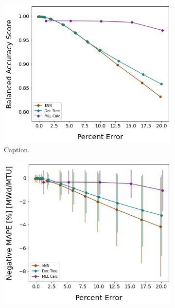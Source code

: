 \begin{figure}[!ht]
    \centering
    \begin{subfigure}[b]{0.49\textwidth}
        \centering
        \includegraphics[width=\textwidth]{./chapters/exp1/randerr_compare_nuc29_BalAcc_rxtr.png}
        \caption[]{Caption.}
    \end{subfigure}
    \hfill
    \begin{subfigure}[b]{0.49\textwidth}
        \centering
        \includegraphics[width=\textwidth]{./chapters/exp1/randerr_compare_nuc29_MAPE_burn.png}

\end{subfigure}
\end{figure}
